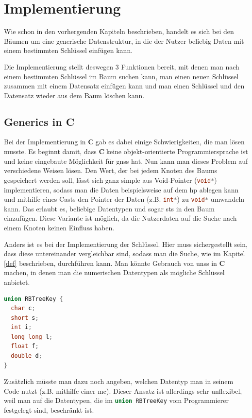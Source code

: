 \documentclass[11pt]{article}
\newcommand{\lstin}[1]{\lstinline[language=C]{#1}}
\newcommand{\cpl}{\textbf{C}$\;$}
\begin{document}
\pagebreak
\section{Implementierung} \label{impl}
Wie schon in den vorhergenden Kapiteln beschrieben, handelt es sich bei den Bäumen um eine generische Datenstruktur, in die der Nutzer beliebig Daten mit einem bestimmten Schlüssel einfügen kann.

Die Implementierung stellt deswegen 3 Funktionen bereit, mit denen man nach einem bestimmten Schlüssel im Baum suchen kann, man einen neuen Schlüssel zusammen mit einem Datensatz einfügen kann und man einen Schlüssel und den Datensatz wieder aus dem Baum löschen kann.

\subsection{Generics in C}
Bei der Implementierung in \cpl gab es dabei einige Schwierigkeiten, die man lösen musste. Es beginnt damit, dass \cpl keine objekt-orientierte Programmiersprache ist und keine eingebaute Möglichkeit für \glspl{gns} hat.
Nun kann man dieses Problem auf verschiedene Weisen lösen. Den Wert, der bei jedem Knoten des Baums gespeichert werden soll, lässt sich ganz simple aus Void-Pointer (\lstin{void*}) implementieren, sodass man die Daten beispielsweise auf dem \gls{hp} ablegen kann
und mithilfe eines Casts den Pointer der Daten (z.B. \lstin{int*}) zu \lstin{void*} umwandeln kann. Das erlaubt es, beliebige Datentypen und sogar \gls{sts} in den Baum einzufügen.
Diese Variante ist möglich, da die Nutzerdaten auf die Suche nach einem Knoten keinen Einfluss haben.

Anders ist es bei der Implementierung der Schlüssel. Hier muss sichergestellt sein, dass diese untereinander vergleichbar sind, sodass man die Suche, wie im Kapitel \ref{def} beschrieben, durchführen kann.
Man könnte Gebrauch von \glspl{uns} in \cpl machen, in denen man die numerischen Datentypen als mögliche Schlüssel anbietet.

\begin{lstlisting}[language=C]
union RBTreeKey {
  char c;
  short s;
  int i;
  long long l;
  float f;
  double d;
}
\end{lstlisting}

Zusätzlich müsste man dazu noch angeben, welchen Datentyp man in seinem Code nutzt (z.B. mithilfe einer \gls{mc}). Dieser Ansatz ist allerdings sehr unflexibel, weil man auf die Datentypen, die im \lstin{union RBTreeKey} vom Programmierer festgelegt sind, beschränkt ist.
\end{document}
